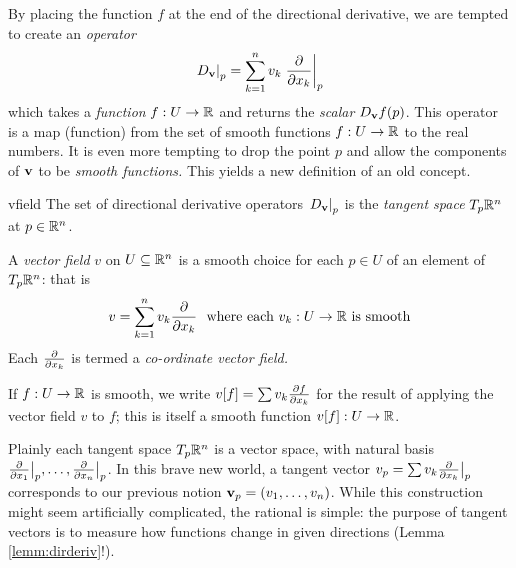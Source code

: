 \goodbreak


By placing the function $f$ at the end of the directional derivative, we are tempted to create an \emph{operator}
\[\at{D_\vv}{p}=\sum_{k=1}^nv_k\partialsat{x_k}{p}\]
which takes a \emph{function} $f:U\to\R$ and returns the \emph{scalar} $D_\vv f(p)$.
This operator is a map (function) from the set of smooth functions $f:U\to\R$ to the real numbers. It is even more tempting to drop the point $p$ and allow the components of $\vv$ to be \emph{smooth functions.} This yields a new definition of an old concept.

\begin{defn}{}{vfield}
The set of directional derivative operators $\at{D_\vv}{p}$ is the \emph{tangent space} $T_p\R^n$ at $p\in\R^n$.\par
A \emph{vector field} $v$ on $U\subseteq\R^n$ is a smooth choice for each $p\in U$ of an element of $T_p\R^n$: that is
\[v=\sum_{k=1}^nv_k\partials{x_k}\ \text{ where each $v_k:U\to\R$ is smooth}\]
Each $\partials{x_k}$ is termed a \emph{co-ordinate vector field.}\par
If $f:U\to\R$ is smooth, we write $v[f]=\sum v_k\partials[f]{x_k}$ for the result of applying the vector field $v$ to $f$; this is itself a smooth function $v[f]:U\to\R$.
\end{defn}

Plainly each tangent space $T_p\R^n$ is a vector space, with natural basis $\smash[b]{\partials{x_1}\big|_p,\ldots,\partials{x_n}\big|_p}$. In this brave new world, a tangent vector $v_p=\sum v_k\partials{x_k}\big|_p$ corresponds to our previous notion $\vv_p=(v_1,\ldots,v_n)$. While this construction might seem artificially complicated, the rational is simple: the purpose of tangent vectors is to measure how functions change in given directions (Lemma \ref{lemm:dirderiv}!).


